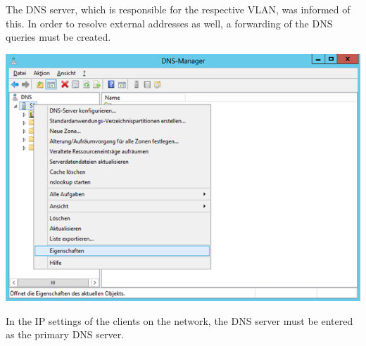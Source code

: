 The DNS server, which is responsible for the respective VLAN, was informed of this. In order to resolve external addresses as well, a forwarding of the DNS queries must be created.\newline


\begin{minipage}[X]{0.8\textwidth} 
	\centering 
	\includegraphics[scale=0.6]{graphics/6.png}  
	\label{ecoconcept} 
\end{minipage} \newline


In the IP settings of the clients on the network, the DNS server must be entered as the primary DNS server.\newline

